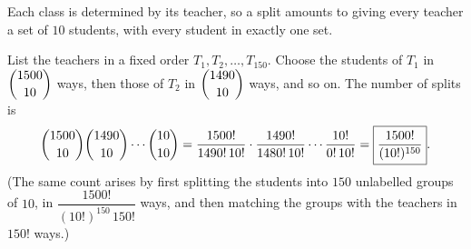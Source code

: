 Each class is determined by its teacher, so a split amounts to giving every teacher a set of $10$ students, with every student in exactly one set.

List the teachers in a fixed order $T_1,T_2,\dots,T_{150}$. Choose the students of $T_1$ in $\dbinom{1500}{10}$ ways, then those of $T_2$ in $\dbinom{1490}{10}$ ways, and so on. The number of splits is
\[
\dbinom{1500}{10}\dbinom{1490}{10}\cdots\dbinom{10}{10}=\dfrac{1500!}{1490!\,10!}\cdot\dfrac{1490!}{1480!\,10!}\cdots\dfrac{10!}{0!\,10!}=\boxed{\dfrac{1500!}{(10!)^{150}}} .
\]
(The same count arises by first splitting the students into $150$ unlabelled groups of $10$, in $\dfrac{1500!}{(10!)^{150}\,150!}$ ways, and then matching the groups with the teachers in $150!$ ways.)
